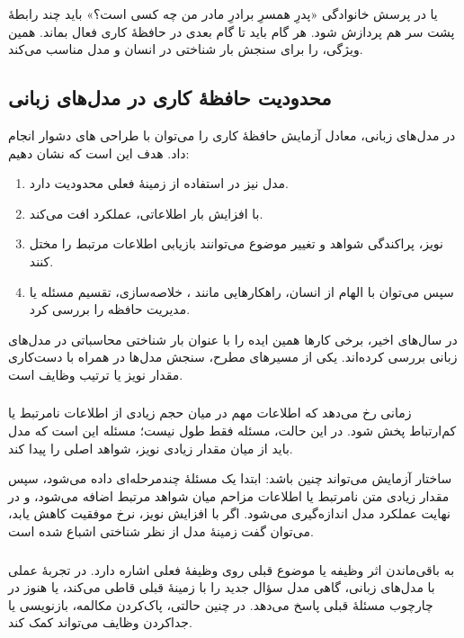 یا در پرسش خانوادگی «پدرِ همسرِ برادرِ مادر من چه کسی است؟» باید چند رابطهٔ پشت سر هم پردازش شود. هر گام باید تا گام بعدی در حافظهٔ کاری فعال بماند. همین ویژگی،  را برای سنجش بار شناختی در انسان و مدل مناسب می‌کند.

\subsection{محدودیت حافظهٔ کاری در مدل‌های زبانی}
در مدل‌های زبانی، معادل آزمایش حافظهٔ کاری را می‌توان با طراحی های دشوار انجام داد. هدف این است که نشان دهیم:
\begin{enumerate}
  \item مدل نیز در استفاده از زمینهٔ فعلی محدودیت دارد.
  \item با افزایش بار اطلاعاتی، عملکرد افت می‌کند.
  \item نویز، پراکندگی شواهد و تغییر موضوع می‌توانند بازیابی اطلاعات مرتبط را مختل کنند.
  \item سپس می‌توان با الهام از انسان، راهکارهایی مانند ، خلاصه‌سازی، تقسیم مسئله یا مدیریت حافظه را بررسی کرد.
\end{enumerate}

در سال‌های اخیر، برخی کارها همین ایده را با عنوان بار شناختی محاسباتی در مدل‌های زبانی بررسی کرده‌اند. یکی از مسیرهای مطرح، سنجش مدل‌ها در  همراه با دست‌کاری مقدار نویز یا ترتیب وظایف است.

\subsubsection{}
 زمانی رخ می‌دهد که اطلاعات مهم در میان حجم زیادی از اطلاعات نامرتبط یا کم‌ارتباط پخش شود. در این حالت، مسئله فقط طول  نیست؛ مسئله این است که مدل باید از میان مقدار زیادی نویز، شواهد اصلی را پیدا کند.

ساختار آزمایش می‌تواند چنین باشد: ابتدا یک مسئلهٔ چندمرحله‌ای داده می‌شود، سپس مقدار زیادی متن نامرتبط یا اطلاعات مزاحم میان شواهد مرتبط اضافه می‌شود، و در نهایت عملکرد مدل اندازه‌گیری می‌شود. اگر با افزایش نویز، نرخ موفقیت کاهش یابد، می‌توان گفت زمینهٔ مدل از نظر شناختی اشباع شده است.

\subsubsection{}
 به باقی‌ماندن اثر وظیفه یا موضوع قبلی روی وظیفهٔ فعلی اشاره دارد. در تجربهٔ عملی با مدل‌های زبانی، گاهی مدل سؤال جدید را با زمینهٔ قبلی قاطی می‌کند، یا هنوز در چارچوب مسئلهٔ قبلی پاسخ می‌دهد. در چنین حالتی، پاک‌کردن مکالمه، بازنویسی  یا جداکردن وظایف می‌تواند کمک کند.

